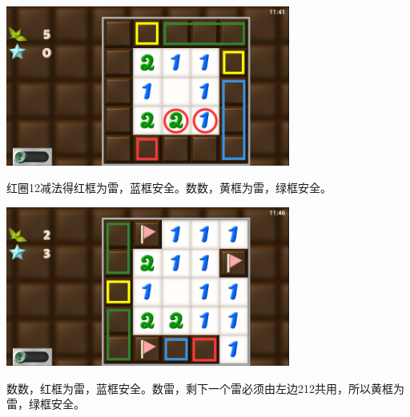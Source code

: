 \subsection{} %
\begin{center}
    \includegraphics[width=0.7\textwidth]{puzzle/16-1.png}
\end{center}
红圈12减法得红框为雷，蓝框安全。数数，黄框为雷，绿框安全。
\begin{center}
    \includegraphics[width=0.7\textwidth]{puzzle/16-2.png}
\end{center}
数数，红框为雷，蓝框安全。数雷，剩下一个雷必须由左边212共用，所以黄框为雷，绿框安全。

